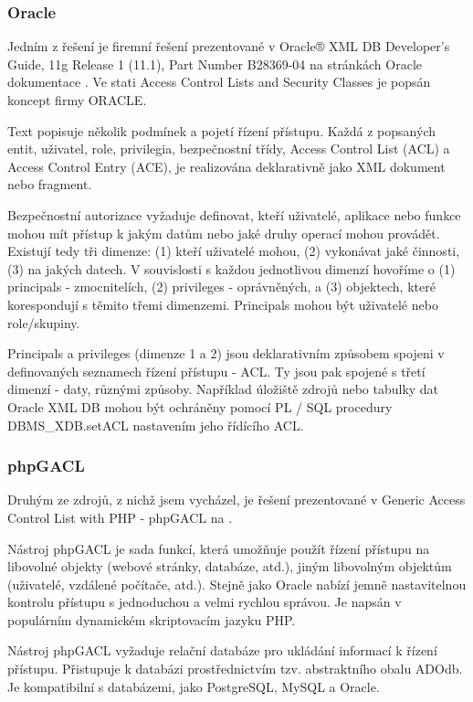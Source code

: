 \subsubsection{Oracle}
Jedním z řešení je firemní řešení prezentované v Oracle® XML DB Developer's Guide, 11g Release 1 (11.1), Part Number B28369-04 na stránkách Oracle dokumentace \cite{oracle}. Ve stati Access Control Lists and Security Classes je popsán koncept firmy ORACLE.
 
Text popisuje několik podmínek a pojetí řízení přístupu. Každá z popsaných entit, uživatel, role, privilegia, bezpečnostní třídy, Access Control List (ACL) a Access Control Entry (ACE), je realizována deklarativně jako XML dokument nebo fragment.  

Bezpečnostní autorizace vyžaduje definovat, kteří uživatelé, aplikace nebo funkce mohou mít přístup k jakým datům nebo jaké druhy operací mohou provádět. Existují tedy tři dimenze: (1) kteří uživatelé mohou, (2) vykonávat jaké činnosti, (3) na jakých datech. V souvislosti s každou jednotlivou dimenzí hovoříme o (1) principals - zmocnitelích, (2) privileges - oprávněných, a (3) objektech, které korespondují s těmito třemi dimenzemi. Principals mohou být uživatelé nebo role/skupiny.

Principals a privileges (dimenze 1 a 2) jsou deklarativním způsobem spojeni v definovaných seznamech řízení přístupu - ACL. Ty jsou pak spojené s třetí dimenzí - daty, různými způsoby. Například úložiště zdrojů nebo tabulky dat Oracle XML DB mohou být ochráněny pomocí PL / SQL procedury DBMS\_XDB.setACL nastavením jeho řídícího ACL.


\subsubsection{phpGACL}
Druhým ze zdrojů, z nichž jsem vycházel, je řešení prezentované v Generic Access Control List with PHP - phpGACL na \cite{phpGACL}.

Nástroj phpGACL je sada funkcí, která umožňuje použít řízení přístupu na libovolné objekty (webové stránky, databáze, atd.), jiným libovolným objektům (uživatelé, vzdálené počítače, atd.). 
Stejně jako Oracle nabízí jemně nastavitelnou kontrolu přístupu s jednoduchou a velmi rychlou správou. Je napsán v populárním dynamickém skriptovacím jazyku PHP.

Nástroj phpGACL vyžaduje relační databáze pro ukládání informací k řízení přístupu. Přistupuje k databázi prostřednictvím tzv. abstraktního obalu ADOdb. Je kompatibilní s databázemi, jako PostgreSQL, MySQL a Oracle. 

